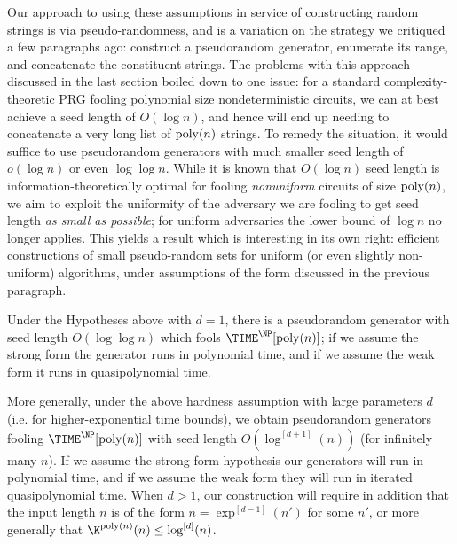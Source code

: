 Our approach to using these assumptions in service of constructing random strings is via pseudo-randomness, and is a variation on the strategy we critiqued a few paragraphs ago: construct a pseudorandom generator, enumerate its range, and concatenate the constituent strings. The problems with this approach discussed in the last section boiled down to one issue: for a standard complexity-theoretic PRG fooling polynomial size nondeterministic circuits, we can at best achieve a seed length of $O(\log n)$, and hence will end up needing to concatenate a very long list of $\mathrm{poly}(n)$ strings. To remedy the situation, it would suffice to use pseudorandom generators with much smaller seed length of $o(\log n)$ or even $\log \log n$. While it is known that $O(\log n)$ seed length is information-theoretically optimal for fooling \emph{nonuniform} circuits of size $\mathrm{poly}(n)$, we aim to exploit the uniformity of the adversary we are fooling to get seed length {\it as small as possible}; for uniform adversaries the lower bound of $\log n$ no longer applies. This yields a result which is interesting in its own right: efficient constructions of small pseudo-random sets for uniform (or even slightly non-uniform) algorithms, under assumptions of the form discussed in the previous paragraph. 




\begin{theorem}
\label{randomstrings:thm:mainthm1}

Under the Hypotheses above with $d=1$, there is a pseudorandom generator with seed length $O(\log \log n)$ which fools $\TIME^{\NP}[\poly(n)]$; if we assume the strong form the generator runs in polynomial time, and if we assume the weak form it runs in quasipolynomial time.

More generally, under the above hardness assumption with large parameters $d$ (i.e. for higher-exponential time bounds), we obtain pseudorandom generators fooling $\TIME^{\NP}[\poly(n)]$ with seed length $O(\log^{[d+1]}(n))$ (for infinitely many $n$). If we assume the strong form hypothesis our generators will run in polynomial time, and if we assume the weak form they will run in iterated quasipolynomial time. When $d > 1$, our construction will require in addition that the input length $n$ is of the form $n = \exp^{[d-1]}(n')$ for some $n'$, or more generally that $\K^{\poly(n)}(n) \leq \log^{[d]}(n)$.
\end{theorem}

